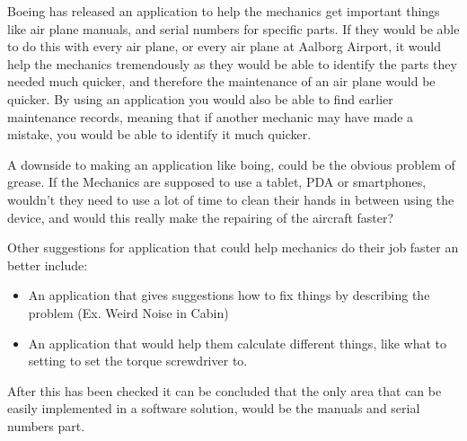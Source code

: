 Boeing has released an application to help the mechanics get important things like air plane manuals, and serial numbers for specific parts. If they would be able to do this with every air plane, or every air plane at Aalborg Airport, it would help the mechanics tremendously as they would be able to identify the parts they needed much quicker, and therefore the maintenance of an air plane would be quicker. By using an application you would also be able to find earlier maintenance records, meaning that if another mechanic may have made a mistake, you would be able to identify it much quicker\cite{cnet_boeing_app}.

A downside to making an application like boing, could be the obvious problem of grease. If the Mechanics are supposed to use a tablet, PDA or smartphones, wouldn't they need to use a lot of time to clean their hands in between using the device, and would this really make the repairing of the aircraft faster?

Other suggestions for application that could help mechanics do their job faster an better include:
\begin{itemize}
\item An application that gives suggestions how to fix things by describing the problem (Ex. Weird Noise in Cabin)
\item An application that would help them calculate different things, like what to setting to set the torque screwdriver to. 
\end{itemize}

After this has been checked it can be concluded that the only area that can be easily implemented in a software solution, would be the manuals and serial numbers part.
